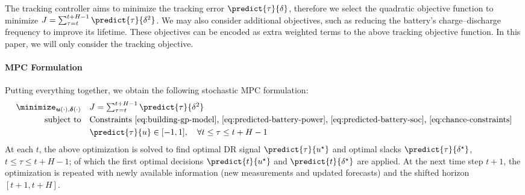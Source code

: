 The tracking controller aims to minimize the tracking error \(\predict{\tau}{\delta}\),
therefore we select the quadratic objective function to minimize
\(J = \textstyle\sum_{\tau = t}^{t+H-1} \predict{\tau}{\delta^2}\).
We may also consider additional objectives, such as reducing the battery's charge--discharge frequency to improve its lifetime.
These objectives can be encoded as extra weighted terms to the above tracking objective function.
In this paper, we will only consider the tracking objective.


\paragraph{MPC Formulation}

Putting everything together,  we obtain the following stochastic MPC formulation:
\begin{align*}
\minimize_{\boldsymbol{u}(\cdot), \boldsymbol{\delta}(\cdot)} \quad & J = \textstyle\sum_{\tau = t}^{t+H-1} \predict{\tau}{\delta^2} \\
\text{subject to} \quad & \text{Constraints \eqref{eq:building-gp-model}, \eqref{eq:predicted-battery-power}, \eqref{eq:predicted-battery-soc}, \eqref{eq:chance-constraints}} \\
& \predict{\tau}{u} \in [-1, 1], \quad \forall t \leq \tau \leq t+H-1 
\end{align*}
At each \(t\), the above optimization is solved to find optimal DR signal \(\predict{\tau}{u^\star}\) and optimal slacks \(\predict{\tau}{\delta^\star}\), \(t \leq \tau \leq t+H-1\); of which the first optimal decisions \(\predict{t}{u^\star}\) and \(\predict{t}{\delta^\star}\) are applied.
At the next time step \(t+1\), the optimization is repeated with newly available information (\ie new measurements and updated forecasts) and the shifted horizon \([t+1,t+H]\).

